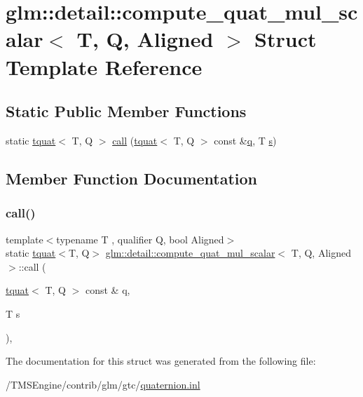 \hypertarget{structglm_1_1detail_1_1compute__quat__mul__scalar}{}\section{glm\+:\+:detail\+:\+:compute\+\_\+quat\+\_\+mul\+\_\+scalar$<$ T, Q, Aligned $>$ Struct Template Reference}
\label{structglm_1_1detail_1_1compute__quat__mul__scalar}
\subsection*{Static Public Member Functions}
\begin{DoxyCompactItemize}
\item 
static \hyperlink{structglm_1_1tquat}{tquat}$<$ T, Q $>$ \hyperlink{structglm_1_1detail_1_1compute__quat__mul__scalar_abc5cbc89b3e84f7a3dedca119fbded4d}{call} (\hyperlink{structglm_1_1tquat}{tquat}$<$ T, Q $>$ const \&\hyperlink{_s_d_l__opengl_8h_a8fc1e7b9baaae687804c7eed46ca09c6}{q}, T \hyperlink{_s_d_l__opengl_8h_a4af680a6c683f88ed67b76f207f2e6e4}{s})
\end{DoxyCompactItemize}


\subsection{Member Function Documentation}
\mbox{\label{structglm_1_1detail_1_1compute__quat__mul__scalar_abc5cbc89b3e84f7a3dedca119fbded4d}} 
\subsubsection{\texorpdfstring{call()}{call()}}
{\footnotesize\ttfamily template$<$typename T , qualifier Q, bool Aligned$>$ \\
static \hyperlink{structglm_1_1tquat}{tquat}$<$T, Q$>$ \hyperlink{structglm_1_1detail_1_1compute__quat__mul__scalar}{glm\+::detail\+::compute\+\_\+quat\+\_\+mul\+\_\+scalar}$<$ T, Q, Aligned $>$\+::call (\begin{DoxyParamCaption}\item[{\hyperlink{structglm_1_1tquat}{tquat}$<$ T, Q $>$ const \&}]{q,  }\item[{T}]{s }\end{DoxyParamCaption})\hspace{0.3cm}{\ttfamily [inline]}, {\ttfamily [static]}}



The documentation for this struct was generated from the following file\+:\begin{DoxyCompactItemize}
\item 
/\+T\+M\+S\+Engine/contrib/glm/gtc/\hyperlink{gtc_2quaternion_8inl}{quaternion.\+inl}\end{DoxyCompactItemize}
